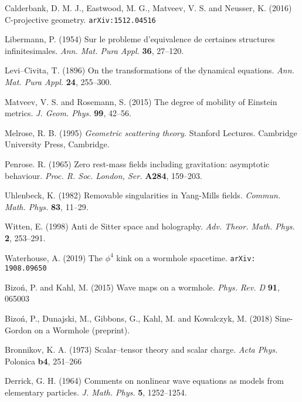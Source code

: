 \begin{thebibliography}{}
 Calderbank,  D. M. J.,  Eastwood, M. G.,  Matveev, V. S. and 
Neusser, K.  (2016) C-projective geometry. {\tt arXiv:1512.04516}



Libermann, P. (1954) Sur le probleme d'equivalence de certaines structures infinitesimales. \textit{Ann.
Mat. Pura Appl.} {\bf 36}, 27--120.


 Levi--Civita, T. (1896) On the transformations of the 
dynamical equations. \textit{Ann. Mat. Pura Appl.} {\bf 24}, 255--300.

 Matveev, V. S. and Rosemann, S. (2015)
The degree of mobility of Einstein metrics. \textit{J. Geom. Phys.}
{\bf 99}, 42--56.


Melrose, R. B. (1995)
{\em Geometric scattering theory.} Stanford Lectures. Cambridge University Press,
Cambridge.

Penrose. R. (1965) Zero rest-mass fields including gravitation: asymptotic behaviour. \textit{Proc. R. 
Soc. London, Ser.} {\bf A284}, 159--203.

 Uhlenbeck, K. (1982) Removable singularities in Yang-Mills fields.
\textit{Commun. Math. Phys.} {\bf 83}, 11--29.

 Witten, E. (1998)
Anti de Sitter space and holography. \textit{Adv. Theor. Math. Phys.} {\bf 2}, 253--291.


 Waterhouse, A. (2019)
The $\phi^4$ kink on a wormhole spacetime. {\tt arXiv: 1908.09650}

 Bizo\'n, P. and Kahl, M. (2015)
Wave maps on a wormhole. \textit{Phys. Rev. D} {\bf 91}, 065003

 Bizo\'n, P., Dunajski, M., Gibbons, G., Kahl, M. and Kowalczyk, M. (2018) Sine-Gordon on a Wormhole (preprint).

 Bronnikov, K. A. (1973)
Scalar--tensor theory and scalar charge. \textit{Acta Phys.} Polonica {\bf b4}, 251--266

 Derrick, G. H. (1964)
Comments on nonlinear wave equations as models from elementary particles. \textit{J. Math. Phys.} {\bf 5}, 1252--1254.


\end{thebibliography}
